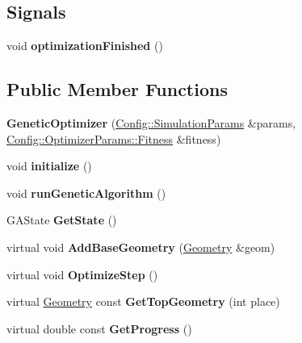 \subsection*{Signals}
\begin{DoxyCompactItemize}
\item 
\hypertarget{class_genetic_optimizer_ad51ae7c1b9048c2d9df23269ac9281c8}{}\label{class_genetic_optimizer_ad51ae7c1b9048c2d9df23269ac9281c8} 
void {\bfseries optimization\+Finished} ()
\end{DoxyCompactItemize}
\subsection*{Public Member Functions}
\begin{DoxyCompactItemize}
\item 
\hypertarget{class_genetic_optimizer_aee9c0a4fcf7738ebb36b866a6167ecc1}{}\label{class_genetic_optimizer_aee9c0a4fcf7738ebb36b866a6167ecc1} 
{\bfseries Genetic\+Optimizer} (\hyperlink{struct_config_1_1_simulation_params}{Config\+::\+Simulation\+Params} \&params, \hyperlink{struct_config_1_1_optimizer_params_1_1_fitness}{Config\+::\+Optimizer\+Params\+::\+Fitness} \&fitness)
\item 
\hypertarget{class_genetic_optimizer_af0e47a91e79cf2361b6974d699504459}{}\label{class_genetic_optimizer_af0e47a91e79cf2361b6974d699504459} 
void {\bfseries initialize} ()
\item 
\hypertarget{class_genetic_optimizer_ac3350b35f1b7072ec75aef879d74d125}{}\label{class_genetic_optimizer_ac3350b35f1b7072ec75aef879d74d125} 
void {\bfseries run\+Genetic\+Algorithm} ()
\item 
\hypertarget{class_genetic_optimizer_a701cb357dee66f50f7fab0307536ff86}{}\label{class_genetic_optimizer_a701cb357dee66f50f7fab0307536ff86} 
G\+A\+State {\bfseries Get\+State} ()
\item 
\hypertarget{class_genetic_optimizer_a33826271122b05404035cd49e5c4db11}{}\label{class_genetic_optimizer_a33826271122b05404035cd49e5c4db11} 
virtual void {\bfseries Add\+Base\+Geometry} (\hyperlink{class_geometry}{Geometry} \&geom)
\item 
\hypertarget{class_genetic_optimizer_a95aceb015fdaafbd8452cfb82697e5af}{}\label{class_genetic_optimizer_a95aceb015fdaafbd8452cfb82697e5af} 
virtual void {\bfseries Optimize\+Step} ()
\item 
\hypertarget{class_genetic_optimizer_a86946cfba2c49218acde44312e20ed46}{}\label{class_genetic_optimizer_a86946cfba2c49218acde44312e20ed46} 
virtual \hyperlink{class_geometry}{Geometry} const {\bfseries Get\+Top\+Geometry} (int place)
\item 
\hypertarget{class_genetic_optimizer_a256ecf866007f0860a85bdca34754bd8}{}\label{class_genetic_optimizer_a256ecf866007f0860a85bdca34754bd8} 
virtual double const {\bfseries Get\+Progress} ()
\end{DoxyCompactItemize}


